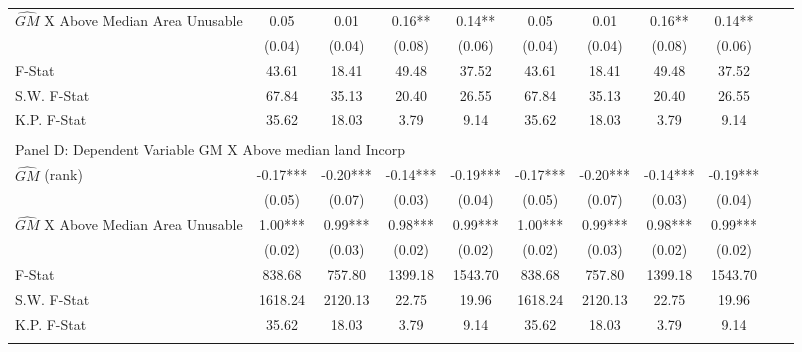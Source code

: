\begin{table}[htbp]
\begin{threeparttable}
\begin{tabular}{l*{10}{c}}
\addlinespace
$\hat{GM}$ X Above Median Area Unusable&       0.05   &       0.01   &       0.16** &       0.14** &       0.05   &       0.01   &       0.16** &       0.14** \\
                &     (0.04)   &     (0.04)   &     (0.08)   &     (0.06)   &     (0.04)   &     (0.04)   &     (0.08)   &     (0.06)   \\
\midrule
F-Stat          &      43.61   &      18.41   &      49.48   &      37.52   &      43.61   &      18.41   &      49.48   &      37.52   \\
S.W. F-Stat     &      67.84   &      35.13   &      20.40   &      26.55   &      67.84   &      35.13   &      20.40   &      26.55   \\
K.P. F-Stat     &      35.62   &      18.03   &       3.79   &       9.14   &      35.62   &      18.03   &       3.79   &       9.14   \\
\cmidrule[\heavyrulewidth](lr){1-9} \\ \cmidrule[\heavyrulewidth](lr){1-9}
\multicolumn{8}{l}{Panel D: Dependent Variable GM X Above median land Incorp}\\
\cmidrule(lr){1-9}
$\hat{GM}$ (rank)&      -0.17***&      -0.20***&      -0.14***&      -0.19***&      -0.17***&      -0.20***&      -0.14***&      -0.19***\\
                &     (0.05)   &     (0.07)   &     (0.03)   &     (0.04)   &     (0.05)   &     (0.07)   &     (0.03)   &     (0.04)   \\
\addlinespace
$\hat{GM}$ X Above Median Area Unusable&       1.00***&       0.99***&       0.98***&       0.99***&       1.00***&       0.99***&       0.98***&       0.99***\\
                &     (0.02)   &     (0.03)   &     (0.02)   &     (0.02)   &     (0.02)   &     (0.03)   &     (0.02)   &     (0.02)   \\
\midrule
F-Stat          &     838.68   &     757.80   &    1399.18   &    1543.70   &     838.68   &     757.80   &    1399.18   &    1543.70   \\
S.W. F-Stat     &    1618.24   &    2120.13   &      22.75   &      19.96   &    1618.24   &    2120.13   &      22.75   &      19.96   \\
K.P. F-Stat     &      35.62   &      18.03   &       3.79   &       9.14   &      35.62   &      18.03   &       3.79   &       9.14   \\
\cmidrule[\heavyrulewidth](lr){1-9} \\ \cmidrule[\heavyrulewidth](lr){1-9}

\end{tabular}
\end{threeparttable}
\end{table}
